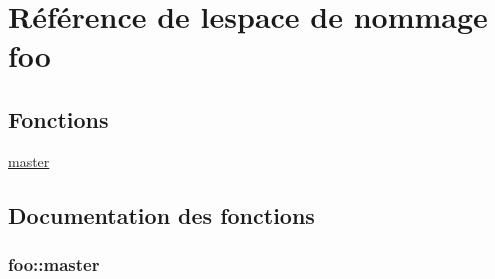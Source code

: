 \hypertarget{namespacefoo}{}\section{Référence de l\textquotesingle{}espace de nommage foo}
\label{namespacefoo}
\subsection*{Fonctions}
\begin{DoxyCompactItemize}
\item 
\hyperlink{namespacefoo_a265acdcaea6da32c3bbd9afb5d0e32a4}{master}
\end{DoxyCompactItemize}


\subsection{Documentation des fonctions}
\hypertarget{namespacefoo_a265acdcaea6da32c3bbd9afb5d0e32a4}{}
\subsubsection[{master}]{\setlength{\rightskip}{0pt plus 5cm}foo\+::master}\label{namespacefoo_a265acdcaea6da32c3bbd9afb5d0e32a4}
